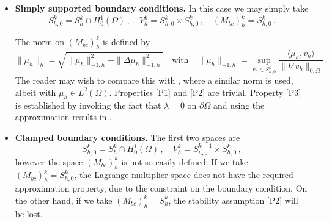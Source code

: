 \documentclass[a4paper,final]{siamltex}
\newcommand{\Mb}{{(M_{bc})}}
\begin{document}
\begin{itemize}
\item {\bf Simply supported boundary conditions.} In this case we may simply take
\[
	S^k_{h,0}= S^k_h\cap H^1_0(\Omega)\,,
	\quad
	V^k_h = S^k_{h,0}\times S^k_{h,0}\,,
	\quad
	\Mb^k_h = S^k_{h,0}
	\,.
\]

The norm on $\Mb_h^k$ is defined by
\[
	\|\mu_h\|_{h} = \sqrt{\|\mu_h\|_{-1,h}^2+ \|\Delta \mu_h\|_{-1,h}^2}\quad\text{with}\quad
	\|\mu_h\|_{-1,h}= \sup_{v_h \in S^k_{h,0}} \frac{\langle \mu_h,v_h\rangle}{\|\nabla {v_h}\|_{0,\Omega}}
\,.
\]
The reader may wish to compare this with \cite{Zul15}, where a similar norm is used, albeit with
$\mu_h\in L^2(\Omega)$.
Properties [P1] and [P2] are trivial.
Property [P3] is established by invoking the fact that $\lambda=0$ on $\partial\Omega$
and using the approximation results in \cite{Bra01,BS94}.

\item {\bf Clamped boundary conditions.} The first two spaces are
\[
	S^k_{h,0}= S^k_h\cap H^1_0(\Omega)\,,
	\quad
	V^k_h = S^{k+1}_{h,0}\times S^k_{h,0}\,,
\]
	however the space $\Mb^k_h$ is not so easily defined.
If we take $\Mb^k_h = S^k_{h,0}$, the Lagrange multiplier
space does not have the required approximation property, due to the constraint
on the boundary condition. On the other hand, if
we take $\Mb^k_h= S^k_h$, the stability assumption 
[P2] will be lost.  


\end{itemize}
\end{document}

